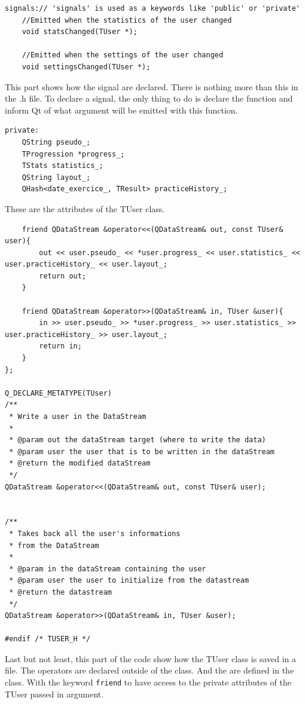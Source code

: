 \begin{lstlisting}
signals:// 'signals' is used as a keywords like 'public' or 'private'
	//Emitted when the statistics of the user changed
    void statsChanged(TUser *);

	//Emitted when the settings of the user changed
    void settingsChanged(TUser *);
\end{lstlisting}
This part shows how the signal are declared. There is nothing more than this in the .h file. To declare a signal, the only thing to do is declare the function and inform Qt of what argument will be emitted with this function.

\begin{lstlisting}
private:
    QString pseudo_;
    TProgression *progress_;
    TStats statistics_;
    QString layout_;
	QHash<date_exercice_, TResult> practiceHistory_;
\end{lstlisting}
These are the attributes of the TUser class.

\begin{lstlisting}
    friend QDataStream &operator<<(QDataStream& out, const TUser& user){
        out << user.pseudo_ << *user.progress_ << user.statistics_ << user.practiceHistory_ << user.layout_;
        return out;
    }

    friend QDataStream &operator>>(QDataStream& in, TUser &user){
        in >> user.pseudo_ >> *user.progress_ >> user.statistics_ >> user.practiceHistory_ >> user.layout_;
        return in;
    }
};

Q_DECLARE_METATYPE(TUser)
/**
 * Write a user in the DataStream
 * 
 * @param out the dataStream target (where to write the data)
 * @param user the user that is to be written in the dataStream
 * @return the modified dataStream
 */
QDataStream &operator<<(QDataStream& out, const TUser& user);


/**
 * Takes back all the user's informations
 * from the DataStream
 * 
 * @param in the dataStream containing the user
 * @param user the user to initialize from the datastream
 * @return the datastream
 */
QDataStream &operator>>(QDataStream& in, TUser &user);

#endif /* TUSER_H */

\end{lstlisting}
Last but not least, this part of the code show how the TUser class is saved in a file. The operators are declared outside of the class. And the are defined in the class. With the keyword \texttt{friend} to have access to the private attributes of the TUser passed in argument.

